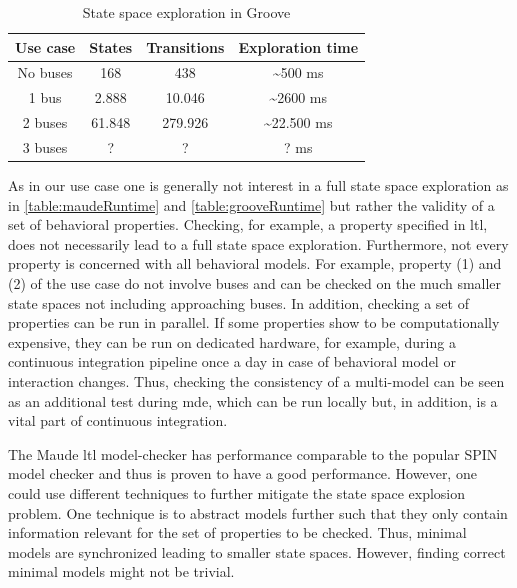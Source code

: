 \documentclass{jot}
\begin{document}
\begin{table}
\centering
\begin{tabular}{|c || c | c | c |}
 \hline
 Use case & States & Transitions & Exploration time \\
 \hline\hline
 No buses & 168 & 438 & \textasciitilde 500 ms \\
 \hline
 1 bus & 2.888 & 10.046 & \textasciitilde 2600 ms \\
 \hline
 2 buses & 61.848 & 279.926 & \textasciitilde 22.500 ms \\
 \hline
 3 buses & ? & ? & ? ms \\
 \hline
\end{tabular}
\caption[State space exploration in Groove]{State space exploration in Groove}
\label{table:grooveRuntime}
\end{table}

As in our use case one is generally not interest in a full state space exploration as in \autoref{table:maudeRuntime} and \autoref{table:grooveRuntime} but rather the validity of a set of behavioral properties.
Checking, for example, a property specified in \gls*{ltl}, does not necessarily lead to a full state space exploration.
Furthermore, not every property is concerned with all behavioral models.
For example, property (1) and (2) of the use case do not involve buses and can be checked on the much smaller state spaces not including approaching buses.
In addition, checking a set of properties can be run in parallel.
If some properties show to be computationally expensive, they can be run on dedicated hardware, for example, during a continuous integration pipeline once a day in case of behavioral model or interaction changes.
Thus, checking the consistency of a multi-model can be seen as an additional test during \gls*{mde}, which can be run locally but, in addition, is a vital part of continuous integration.

The Maude \gls*{ltl} model-checker has performance comparable to the popular SPIN model checker \cite{ekerMaudeLTLModel2004} and thus is proven to have a good performance.
However, one could use different techniques to further mitigate the state space explosion problem.
One technique is to abstract models further such that they only contain information relevant for the set of properties to be checked.
Thus, minimal models are synchronized leading to smaller state spaces.
However, finding correct minimal models might not be trivial.
\end{document}
